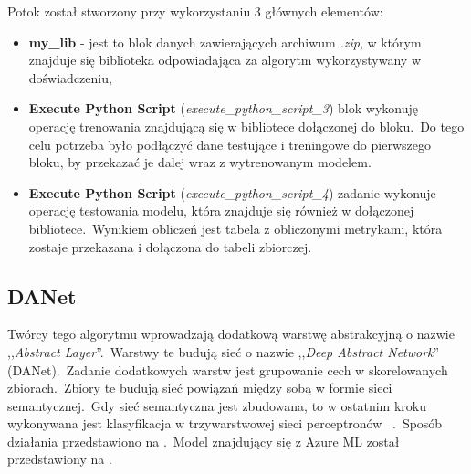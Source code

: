 Potok został stworzony przy wykorzystaniu 3 głównych elementów:
\begin{itemize}
    \item \textbf{my\_lib} - jest to blok danych zawierających archiwum \textit{.zip}, w którym znajduje się biblioteka odpowiadająca za algorytm wykorzystywany w doświadczeniu,
    \item \textbf{Execute Python Script} (\textit{execute\_python\_script\_3}) blok wykonuję operację trenowania znajdującą się w bibliotece dołączonej do bloku.\ Do tego celu potrzeba było podłączyć dane testujące i treningowe do pierwszego bloku, by przekazać je dalej wraz z wytrenowanym modelem.
    \item \textbf{Execute Python Script} (\textit{execute\_python\_script\_4}) zadanie wykonuje operację testowania modelu, która znajduje się również w dołączonej bibliotece.\ Wynikiem obliczeń jest tabela z obliczonymi metrykami, która zostaje przekazana i dołączona do tabeli zbiorczej.
\end{itemize}

\subsection{DANet}
Twórcy tego algorytmu wprowadzają dodatkową warstwę abstrakcyjną o nazwie ,,\textit{Abstract Layer}''.\ Warstwy te budują sieć o nazwie ,,\textit{Deep Abstract Network}'' (DANet).\ Zadanie dodatkowych warstw jest grupowanie cech w skorelowanych zbiorach.\ Zbiory te budują sieć powiązań między sobą w formie sieci semantycznej.\ Gdy sieć semantyczna jest zbudowana, to w ostatnim kroku wykonywana jest klasyfikacja w trzywarstwowej sieci perceptronów ~\cite{Chen2022, Danet}.\ Sposób działania przedstawiono na .\ Model znajdujący się z Azure ML został przedstawiony na .


